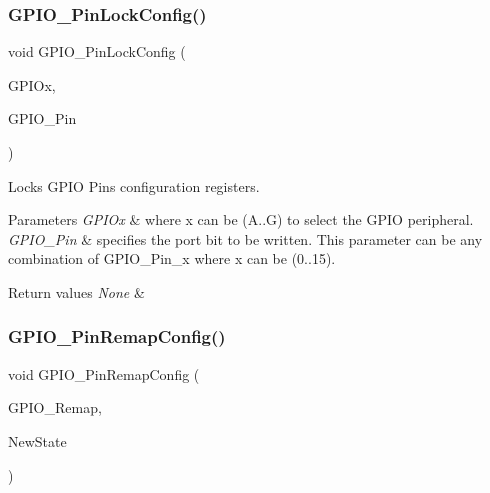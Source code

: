 \subsubsection{\texorpdfstring{GPIO\_PinLockConfig()}{GPIO\_PinLockConfig()}}
{\footnotesize\ttfamily void G\+P\+I\+O\+\_\+\+Pin\+Lock\+Config (\begin{DoxyParamCaption}\item[{\mbox{\hyperlink{struct_g_p_i_o___type_def}{G\+P\+I\+O\+\_\+\+Type\+Def}} $\ast$}]{G\+P\+I\+Ox,  }\item[{uint16\+\_\+t}]{G\+P\+I\+O\+\_\+\+Pin }\end{DoxyParamCaption})}



Locks G\+P\+IO Pins configuration registers. 


\begin{DoxyParams}{Parameters}
{\em G\+P\+I\+Ox} & where x can be (A..G) to select the G\+P\+IO peripheral. \\
\hline
{\em G\+P\+I\+O\+\_\+\+Pin} & specifies the port bit to be written. This parameter can be any combination of G\+P\+I\+O\+\_\+\+Pin\+\_\+x where x can be (0..15). \\
\hline
\end{DoxyParams}

\begin{DoxyRetVals}{Return values}
{\em None} & \\
\hline
\end{DoxyRetVals}
\mbox{\label{group___g_p_i_o___private___functions_ga64eb76f6211b840daf9829289df4208b}} 
\subsubsection{\texorpdfstring{GPIO\_PinRemapConfig()}{GPIO\_PinRemapConfig()}}
{\footnotesize\ttfamily void G\+P\+I\+O\+\_\+\+Pin\+Remap\+Config (\begin{DoxyParamCaption}\item[{uint32\+\_\+t}]{G\+P\+I\+O\+\_\+\+Remap,  }\item[{\mbox{\hyperlink{group___exported__types_gac9a7e9a35d2513ec15c3b537aaa4fba1}{Functional\+State}}}]{New\+State }\end{DoxyParamCaption})}



